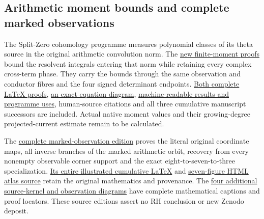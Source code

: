 \documentclass[
]{article}
\begin{document}
\subsection{Arithmetic moment bounds and complete marked
observations}\label{arithmetic-moment-bounds-and-complete-marked-observations}

The Split-Zero cohomology programme measures polynomial classes of its
theta source in the original arithmetic convolution norm. The
\href{https://github.com/KokunoYumeto/zeta-function-research-reader/blob/main/workbenches/splitzero-tandem/continuations/20260920-native-moment-resolvents/README.md}{new
finite-moment proofs} bound the resolvent integrals entering that norm
while retaining every complex cross-term phase. They carry the bounds
through the same observation and conductor fibres and the four signed
determinant endpoints.
\href{https://github.com/KokunoYumeto/zeta-function-research-reader/blob/main/workbenches/splitzero-tandem/continuations/20260920-native-moment-resolvents/COMPLETE_PROOFS.tex}{Both
complete LaTeX proofs},
\href{https://github.com/KokunoYumeto/zeta-function-research-reader/blob/main/workbenches/splitzero-tandem/continuations/20260920-native-moment-resolvents/FIGURE_CAPTION.md}{an
exact equation diagram},
\href{https://github.com/KokunoYumeto/zeta-function-research-reader/blob/main/workbenches/splitzero-tandem/continuations/20260920-native-moment-resolvents/RESULT_INDEX.json}{machine-readable
results and programme uses}, human-source citations and all three
cumulative manuscript successors are included. Actual native moment
values and their growing-degree projected-current estimate remain to be
calculated.

The
\href{https://github.com/KokunoYumeto/zeta-function-research-reader/blob/main/workbenches/splitzero-tandem/continuations/20260920-marked-observation-illustrated/README.md}{complete
marked-observation edition} proves the literal original coordinate maps,
all inverse branches of the marked arithmetic orbit, recovery from every
nonempty observable corner support and the exact eight-to-seven-to-three
specialization.
\href{https://github.com/KokunoYumeto/zeta-function-research-reader/blob/main/workbenches/splitzero-tandem/continuations/20260920-marked-observation-illustrated/FABLE_TO_ORIGINAL_CONDUCTOR.tex}{Its
entire illustrated cumulative LaTeX} and
\href{https://github.com/KokunoYumeto/zeta-function-research-reader/blob/main/workbenches/splitzero-tandem/continuations/20260920-marked-observation-illustrated/FABLE_VISUAL_ATLAS.html}{seven-figure
HTML atlas source} retain the original mathematics and provenance. The
\href{https://github.com/KokunoYumeto/zeta-function-research-reader/blob/main/workbenches/splitzero-tandem/continuations/20260920-native-moment-resolvents/original_source_figures/FIGURE_CAPTIONS.md}{four
additional source-kernel and observation diagrams} have complete
mathematical captions and proof locators. These source editions assert
no RH conclusion or new Zenodo deposit.
\end{document}
